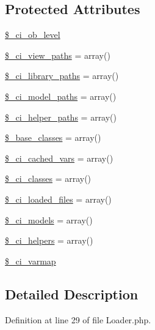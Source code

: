 \subsection*{Protected Attributes}
\begin{DoxyCompactItemize}
\item 
\hyperlink{class_c_i___loader_a499cf11349613b24142f9c13aa83ee1b}{\$\-\_\-ci\-\_\-ob\-\_\-level}
\item 
\hyperlink{class_c_i___loader_adc48c64c673b28c2447ea4214a27eeea}{\$\-\_\-ci\-\_\-view\-\_\-paths} = array()
\item 
\hyperlink{class_c_i___loader_a2cafeab35438db8fc21754e311b14e09}{\$\-\_\-ci\-\_\-library\-\_\-paths} = array()
\item 
\hyperlink{class_c_i___loader_ac5f53015a6bd6ce67af5e30cb156cce4}{\$\-\_\-ci\-\_\-model\-\_\-paths} = array()
\item 
\hyperlink{class_c_i___loader_a6ed0348d5a8afc689d71a234de8da95c}{\$\-\_\-ci\-\_\-helper\-\_\-paths} = array()
\item 
\hyperlink{class_c_i___loader_a3f6ad72a17d4acd515c8cc224b94297e}{\$\-\_\-base\-\_\-classes} = array()
\item 
\hyperlink{class_c_i___loader_a963cdc111da481606d2d67adf4c2947f}{\$\-\_\-ci\-\_\-cached\-\_\-vars} = array()
\item 
\hyperlink{class_c_i___loader_adad50876041bed7c7bf44aac03eb1162}{\$\-\_\-ci\-\_\-classes} = array()
\item 
\hyperlink{class_c_i___loader_a610f07342114240cecd9377d55f433f8}{\$\-\_\-ci\-\_\-loaded\-\_\-files} = array()
\item 
\hyperlink{class_c_i___loader_adf3c08ef6905b17b2237bfa89d556f2c}{\$\-\_\-ci\-\_\-models} = array()
\item 
\hyperlink{class_c_i___loader_abc8797a91f1cdb473e2d0ad65dcbff55}{\$\-\_\-ci\-\_\-helpers} = array()
\item 
\hyperlink{class_c_i___loader_a8dd33a8ab99688451b1f811f122d1114}{\$\-\_\-ci\-\_\-varmap}
\end{DoxyCompactItemize}


\subsection{Detailed Description}


Definition at line 29 of file Loader.\-php.



